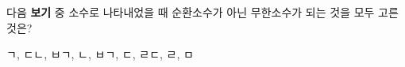 다음 \textbf{보기} 중 소수로 나타내었을 때 순환소수가 아닌 무한소수가 되는 것을 모두 고른 것은?
\begin{choices32}{ㄱ, ㄷ}{ㄴ, ㅂ}{ㄱ, ㄴ, ㅂ}{ㄱ, ㄷ, ㄹ}{ㄷ, ㄹ, ㅁ}\end{choices32}
